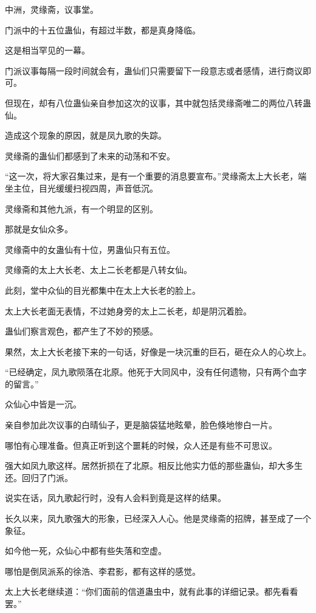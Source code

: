 
\begin{this_body}

中洲，灵缘斋，议事堂。

门派中的十五位蛊仙，有超过半数，都是真身降临。

这是相当罕见的一幕。

门派议事每隔一段时间就会有，蛊仙们只需要留下一段意志或者感情，进行商议即可。

但现在，却有八位蛊仙亲自参加这次的议事，其中就包括灵缘斋唯二的两位八转蛊仙。

造成这个现象的原因，就是凤九歌的失踪。

灵缘斋的蛊仙们都感到了未来的动荡和不安。

“这一次，将大家召集过来，是有一个重要的消息要宣布。”灵缘斋太上大长老，端坐主位，目光缓缓扫视四周，声音低沉。

灵缘斋和其他九派，有一个明显的区别。

那就是女仙众多。

灵缘斋中的女蛊仙有十位，男蛊仙只有五位。

灵缘斋的太上大长老、太上二长老都是八转女仙。

此刻，堂中众仙的目光都集中在太上大长老的脸上。

太上大长老面无表情，不过她身旁的太上二长老，却是阴沉着脸。

蛊仙们察言观色，都产生了不妙的预感。

果然，太上大长老接下来的一句话，好像是一块沉重的巨石，砸在众人的心坎上。

“已经确定，凤九歌陨落在北原。他死于大同风中，没有任何遗物，只有两个血字的留言。”

众仙心中皆是一沉。

亲自参加此次议事的白晴仙子，更是脑袋猛地眩晕，脸色倏地惨白一片。

哪怕有心理准备。但真正听到这个噩耗的时候，众人还是有些不可思议。

强大如凤九歌这样。居然折损在了北原。相反比他实力低的那些蛊仙，却大多生还。回归了门派。

说实在话，凤九歌起行时，没有人会料到竟是这样的结果。

长久以来，凤九歌强大的形象，已经深入人心。他是灵缘斋的招牌，甚至成了一个象征。

如今他一死，众仙心中都有些失落和空虚。

哪怕是倒凤派系的徐浩、李君影，都有这样的感觉。

太上大长老继续道：“你们面前的信道蛊虫中，就有此事的详细记录。都先看看罢。”


\end{this_body}
